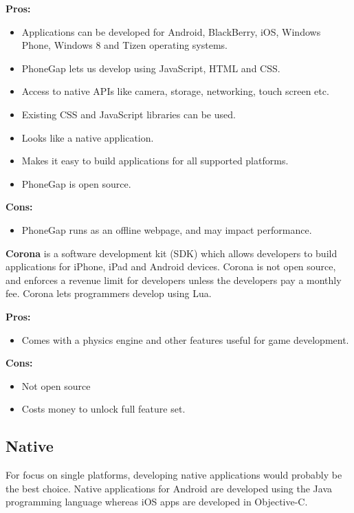 \indent
  {\bf Pros:}
  \begin{itemize}
    \item Applications can be developed for Android, BlackBerry, iOS,
          Windows Phone, Windows 8 and Tizen operating systems.
    \item PhoneGap lets us develop using JavaScript, HTML and CSS.
    \item Access to native APIs like camera, storage, networking,
          touch screen etc.
    \item Existing CSS and JavaScript libraries can be used.
    \item Looks like a native application.
    \item Makes it easy to build applications for all supported platforms.
    \item PhoneGap is open source.
  \end{itemize}

\indent
{\bf Cons:}
  \begin{itemize}
    \item PhoneGap runs as an offline webpage, and may impact performance.
  \end{itemize}

\noindent
{\bf Corona} is a software development kit (SDK) which allows developers to
build applications for iPhone, iPad and Android devices. Corona is not open
source, and enforces a revenue limit for developers unless the developers pay a
monthly fee. Corona lets programmers develop using Lua.
\cite{coronaSDK}

\indent
  {\bf Pros:}
  \begin{itemize}
    \item Comes with a physics engine and other features useful for game
          development.
  \end{itemize}

\indent
  {\bf Cons:}
  \begin{itemize}
    \item Not open source
    \item Costs money to unlock full feature set.
  \end{itemize}

\subsection{Native}
For focus on single platforms, developing native applications would probably be
the best choice. Native applications for Android are developed using the Java
programming language whereas iOS apps are developed in Objective-C.

